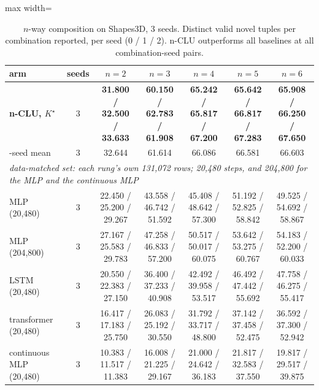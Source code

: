 \documentclass{article} %
\newcommand{\Kstar}{\ensuremath{K^{\star}}}
\begin{document}
\begin{table}[t]
\centering\small
\caption{$n$-way composition on Shapes3D, $3$ seeds. Distinct valid novel tuples per combination reported, per seed (0 / 1 / 2). n-CLU outperforms all baselines at all combination-seed pairs.}
\label{tab:ladder}
\setlength{\tabcolsep}{2.6pt}
\begin{adjustbox}{max width=\linewidth}\begin{tabular}{lcccccc}
\toprule
arm & seeds & $n=2$ & $n=3$ & $n=4$ & $n=5$ & $n=6$ \\
\midrule
\textbf{n-CLU, $\Kstar$} & 3 & \textbf{31.800 / 32.500 / 33.633} & \textbf{60.150 / 62.783 / 61.908} & \textbf{65.242 / 65.817 / 67.200} & \textbf{65.642 / 66.817 / 67.283} & \textbf{65.908 / 66.250 / 67.650} \\
\quad 3-seed mean & 3 & 32.644 & 61.614 & 66.086 & 66.581 & 66.603 \\
\midrule
\multicolumn{7}{l}{\emph{data-matched set: each rung's own 131,072 rows; 20,480 steps, and 204,800 for the MLP and the continuous MLP}} \\ %
MLP (20,480) & 3 & 22.450 / 25.200 / 29.267 & 43.558 / 46.742 / 51.592 & 45.408 / 48.642 / 57.300 & 51.192 / 52.825 / 58.842 & 49.525 / 54.692 / 58.867 \\
MLP (204,800) & 3 & 27.167 / 25.583 / 29.783 & 47.258 / 46.833 / 57.200 & 50.517 / 50.017 / 60.075 & 53.642 / 53.275 / 60.767 & 54.183 / 52.200 / 60.033 \\
LSTM (20,480) & 3 & 20.550 / 22.383 / 27.150 & 36.400 / 37.233 / 40.908 & 42.492 / 39.958 / 53.517 & 46.492 / 47.442 / 55.692 & 47.758 / 46.275 / 55.417 \\
transformer (20,480) & 3 & 16.417 / 17.183 / 25.750 & 26.083 / 25.192 / 30.550 & 31.792 / 33.717 / 48.800 & 37.142 / 37.458 / 52.475 & 36.592 / 37.300 / 52.942 \\
continuous MLP (20,480) & 3 & 10.383 / 11.517 / 11.383 & 16.008 / 21.225 / 29.167 & 21.000 / 24.642 / 36.183 & 21.817 / 32.583 / 37.550 & 19.817 / 29.517 / 39.875 \\

\end{tabular}
\end{adjustbox}
\end{table}
\end{document}
